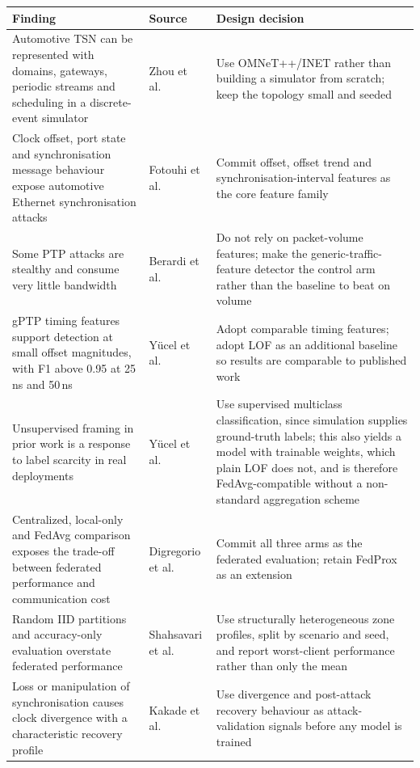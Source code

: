 \begin{longtable}{p{} p{} p{}}
\toprule
\textbf{Finding} & \textbf{Source} & \textbf{Design decision} \\
\midrule
\endhead
Automotive TSN can be represented with domains, gateways, periodic streams and
scheduling in a discrete-event simulator &
Zhou et al.~\cite{zhou2021simulating} &
Use OMNeT++/INET rather than building a simulator from scratch; keep the topology
small and seeded \\
\addlinespace
Clock offset, port state and synchronisation message behaviour expose automotive
Ethernet synchronisation attacks &
Fotouhi et al.~\cite{fotouhi2023assessing} &
Commit offset, offset trend and synchronisation-interval features as the core
feature family \\
\addlinespace
Some PTP attacks are stealthy and consume very little bandwidth &
Berardi et al.~\cite{berardi2023tsn} &
Do not rely on packet-volume features; make the generic-traffic-feature detector the
control arm rather than the baseline to beat on volume \\
\addlinespace
gPTP timing features support detection at small offset magnitudes, with F1 above 0.95
at 25\,ns and 50\,ns &
Y\"ucel et al.~\cite{yucel2026icns} &
Adopt comparable timing features; adopt LOF as an additional baseline so results are
comparable to published work \\
\addlinespace
Unsupervised framing in prior work is a response to label scarcity in real
deployments &
Y\"ucel et al.~\cite{yucel2026icns} &
Use supervised multiclass classification, since simulation supplies ground-truth
labels; this also yields a model with trainable weights, which plain LOF does not,
and is therefore FedAvg-compatible without a non-standard aggregation scheme \\
\addlinespace
Centralized, local-only and FedAvg comparison exposes the trade-off between federated
performance and communication cost &
Digregorio et al.~\cite{digregorio2024federated} &
Commit all three arms as the federated evaluation; retain FedProx as an extension \\
\addlinespace
Random IID partitions and accuracy-only evaluation overstate federated performance &
Shahsavari et al.~\cite{shahsavari2026sok} &
Use structurally heterogeneous zone profiles, split by scenario and seed, and report
worst-client performance rather than only the mean \\
\addlinespace
Loss or manipulation of synchronisation causes clock divergence with a characteristic
recovery profile &
Kakade et al.~\cite{kakade2022vulnerability} &
Use divergence and post-attack recovery behaviour as attack-validation signals before
any model is trained \\
\bottomrule
\end{longtable}

